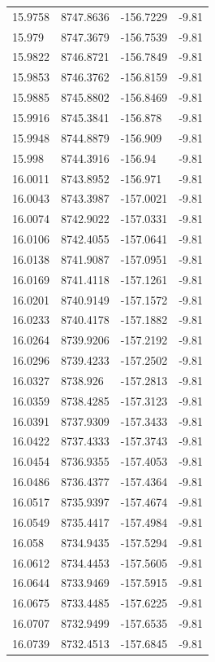 \begin{table}[H]
\begin{tabular}{llll}
15.9758 & 8747.8636 & -156.7229 & -9.81 \\
15.979 & 8747.3679 & -156.7539 & -9.81 \\
15.9822 & 8746.8721 & -156.7849 & -9.81 \\
15.9853 & 8746.3762 & -156.8159 & -9.81 \\
15.9885 & 8745.8802 & -156.8469 & -9.81 \\
15.9916 & 8745.3841 & -156.878 & -9.81 \\
15.9948 & 8744.8879 & -156.909 & -9.81 \\
15.998 & 8744.3916 & -156.94 & -9.81 \\
16.0011 & 8743.8952 & -156.971 & -9.81 \\
16.0043 & 8743.3987 & -157.0021 & -9.81 \\
16.0074 & 8742.9022 & -157.0331 & -9.81 \\
16.0106 & 8742.4055 & -157.0641 & -9.81 \\
16.0138 & 8741.9087 & -157.0951 & -9.81 \\
16.0169 & 8741.4118 & -157.1261 & -9.81 \\
16.0201 & 8740.9149 & -157.1572 & -9.81 \\
16.0233 & 8740.4178 & -157.1882 & -9.81 \\
16.0264 & 8739.9206 & -157.2192 & -9.81 \\
16.0296 & 8739.4233 & -157.2502 & -9.81 \\
16.0327 & 8738.926 & -157.2813 & -9.81 \\
16.0359 & 8738.4285 & -157.3123 & -9.81 \\
16.0391 & 8737.9309 & -157.3433 & -9.81 \\
16.0422 & 8737.4333 & -157.3743 & -9.81 \\
16.0454 & 8736.9355 & -157.4053 & -9.81 \\
16.0486 & 8736.4377 & -157.4364 & -9.81 \\
16.0517 & 8735.9397 & -157.4674 & -9.81 \\
16.0549 & 8735.4417 & -157.4984 & -9.81 \\
16.058 & 8734.9435 & -157.5294 & -9.81 \\
16.0612 & 8734.4453 & -157.5605 & -9.81 \\
16.0644 & 8733.9469 & -157.5915 & -9.81 \\
16.0675 & 8733.4485 & -157.6225 & -9.81 \\
16.0707 & 8732.9499 & -157.6535 & -9.81 \\
16.0739 & 8732.4513 & -157.6845 & -9.81 \\

\end{tabular}
\end{table}

